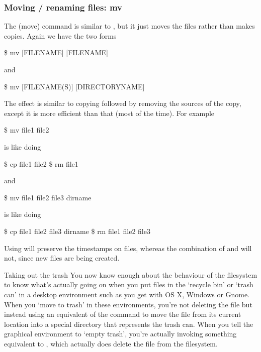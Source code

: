 \subsubsection{Moving / renaming files: mv}

The  (move) command is similar to , but it just moves
the files rather than makes copies. Again we have the two forms
\begin{ttoutenv}
\$  mv [FILENAME] [FILENAME] \return
\end{ttoutenv}
and
\begin{ttoutenv}
\$  mv [FILENAME(S)] [DIRECTORYNAME] \return
\end{ttoutenv}

The effect is similar to copying followed by removing the sources of the copy,
except it is more efficient than that (most of the time).
For example
\begin{ttoutenv}
\$  mv file1 file2 \return
\end{ttoutenv}
is like doing
\begin{ttoutenv}
\$  cp file1 file2 \return
\$  rm file1
\end{ttoutenv}
and
\begin{ttoutenv}
\$  mv file1 file2 file3 dirname \return
\end{ttoutenv}
is like doing
\begin{ttoutenv}
\$  cp file1 file2 file3 dirname \return
\$  rm file1 file2 file3
\end{ttoutenv}
Using  will preserve the timestamps on files, whereas the combination of  and  will not, since new files are being created.

\begin{diversion}{Taking out the trash}
You now know enough about the behaviour of the filesystem to know what's actually going on when you put files in the `recycle bin' or `trash can' in a desktop environment such as you get with OS X, Windows or Gnome. When you `move to trash' in these environments, you're not deleting the file but instead using an equivalent of the  command to move the file from its current location into a special directory that represents the trash can. When you tell the graphical environment to `empty trash', you're actually invoking something equivalent to , which actually does delete the file from the filesystem.
\end{diversion}

%
%


